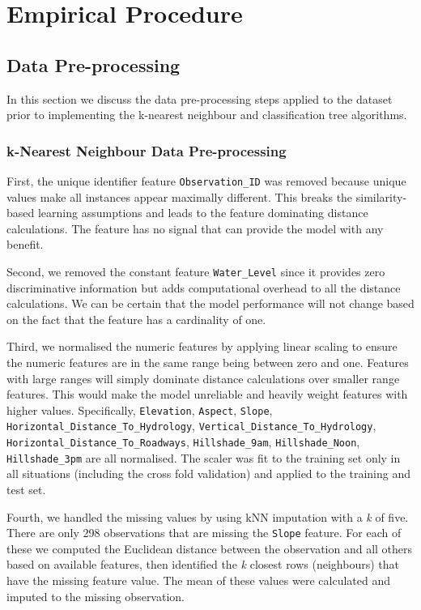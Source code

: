 \documentclass[10pt, conference]{IEEEtran}
\begin{document}
\section{Empirical Procedure}

\subsection{Data Pre-processing}
In this section we discuss the data pre-processing steps applied to the dataset prior to implementing the k-nearest neighbour and classification tree algorithms.
\subsubsection{k-Nearest Neighbour Data Pre-processing}
First, the unique identifier feature \texttt{Observation\_ID} was removed because unique values make all instances appear maximally different. This breaks the similarity-based learning assumptions and leads to the feature dominating distance calculations. The feature has no signal that can provide the model with any benefit.

Second, we removed the constant feature \texttt{Water\_Level} since it provides zero discriminative information but adds computational overhead to all the distance calculations. We can be certain that the model performance will not change based on the fact that the feature has a cardinality of one.

Third, we normalised the numeric features by applying linear scaling to ensure the numeric features are in the same range being between zero and one. Features with large ranges will simply dominate distance calculations over smaller range features. This would make the model unreliable and heavily weight features with higher values. Specifically, \texttt{Elevation}, \texttt{Aspect}, \texttt{Slope}, \texttt{Horizontal\_Distance\_To\_Hydrology}, \texttt{Vertical\_Distance\_To\_Hydrology}, \texttt{Horizontal\_Distance\_To\_Roadways}, \texttt{Hillshade\_9am}, \texttt{Hillshade\_Noon}, \texttt{Hillshade\_3pm}
 are all normalised. The scaler was fit to the training set only in all situations (including the cross fold validation) and applied to the training and test set.
 
 Fourth, we handled the missing values by using kNN imputation with a \textit{k} of five. There are only 298 observations that are missing the \texttt{Slope} feature. For each of these we computed the Euclidean distance between the observation and all others based on available features, then identified the \textit{k} closest rows (neighbours) that have the missing feature value. The mean of these values were calculated and imputed to the missing observation.
 
\end{document}

